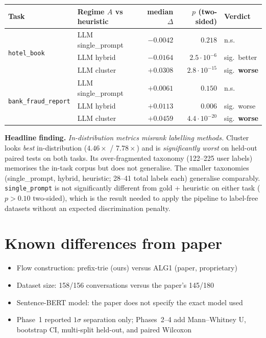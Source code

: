 \documentclass[11pt,a4paper]{article}
\begin{document}
\begin{center}
\begin{tabular}{llrrl}
\toprule
Task & Regime $A$ vs heuristic & median $\Delta$ & $p$ (two-sided) & Verdict \\
\midrule
\multirow{3}{*}{\texttt{hotel\_book}}
  & LLM single\_prompt & $-0.0042$ & $0.218$              & n.s. \\
  & LLM hybrid         & $-0.0164$ & $2.5 \cdot 10^{-6}$  & sig.\ better \\
  & LLM cluster        & $+0.0308$ & $2.8 \cdot 10^{-15}$ & sig.\ \textbf{worse} \\
\midrule
\multirow{3}{*}{\texttt{bank\_fraud\_report}}
  & LLM single\_prompt & $+0.0061$ & $0.150$              & n.s. \\
  & LLM hybrid         & $+0.0113$ & $0.006$              & sig.\ worse \\
  & LLM cluster        & $+0.0459$ & $4.4 \cdot 10^{-20}$ & sig.\ \textbf{worse} \\
\bottomrule
\end{tabular}
\end{center}

\textbf{Headline finding.} \emph{In-distribution metrics misrank labelling methods.} Cluster looks \emph{best} in-distribution ($4.46\times$ / $7.78\times$) and is \emph{significantly worst} on held-out paired tests on both tasks. Its over-fragmented taxonomy (122--225 user labels) memorises the in-task corpus but does not generalise. The smaller taxonomies (single\_prompt, hybrid, heuristic; 28--41 total labels each) generalise comparably. \texttt{single\_prompt} is not significantly different from gold + heuristic on either task ($p > 0.10$ two-sided), which is the result needed to apply the pipeline to label-free datasets without an expected discrimination penalty.

\section{Known differences from paper}

\begin{itemize}
    \item Flow construction: prefix-trie (ours) versus ALG1 (paper, proprietary)
    \item Dataset size: 158/156 conversations versus the paper's 145/180
    \item Sentence-BERT model: the paper does not specify the exact model used
    \item Phase~1 reported $1\sigma$ separation only; Phases~2--4 add Mann--Whitney U, bootstrap CI, multi-split held-out, and paired Wilcoxon
\end{itemize}
\end{document}
